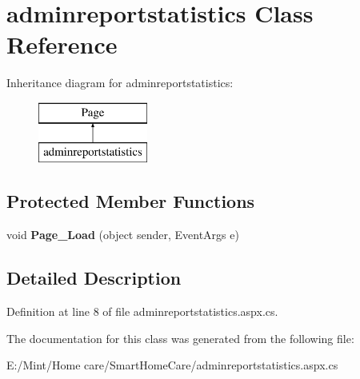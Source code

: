 \hypertarget{classadminreportstatistics}{\section{adminreportstatistics Class Reference}
\label{classadminreportstatistics}
}
Inheritance diagram for adminreportstatistics\-:\begin{figure}[H]
\begin{center}
\leavevmode
\includegraphics[height=2.000000cm]{classadminreportstatistics}
\end{center}
\end{figure}
\subsection*{Protected Member Functions}
\begin{DoxyCompactItemize}
\item 
\hypertarget{classadminreportstatistics_a51b830b544b59599b892de52a1d8f137}{void {\bfseries Page\-\_\-\-Load} (object sender, Event\-Args e)}\label{classadminreportstatistics_a51b830b544b59599b892de52a1d8f137}

\end{DoxyCompactItemize}


\subsection{Detailed Description}


Definition at line 8 of file adminreportstatistics.\-aspx.\-cs.



The documentation for this class was generated from the following file\-:\begin{DoxyCompactItemize}
\item 
E\-:/\-Mint/\-Home care/\-Smart\-Home\-Care/adminreportstatistics.\-aspx.\-cs\end{DoxyCompactItemize}
